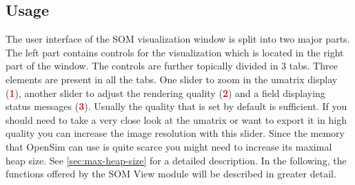 \documentclass[a4paper]{scrartcl}
\newcommand{\imagenumber}[1]{\textcolor{red}{\textbf{#1}}}
\begin{document}
\subsection{Usage}
The user interface of the SOM visualization window is split into two major parts. The left part contains controls for the visualization which is located in the right part of the window. The controls are further topically divided in 3 tabs.
Three elements are present in all the tabs. One slider to zoom in the umatrix display (\imagenumber{1}), another slider to adjust the rendering quality (\imagenumber{2}) and a field displaying status messages (\imagenumber{3}).
Usually the quality that is set by default is sufficient. If you should need to take a very close look at the umatrix or want to export it in high quality you can increase the image resolution with this slider. Since the memory that OpenSim can use is quite scarce you might need to increase its maximal heap size. See \ref{sec:max-heap-size} for a detailed description.
In the following, the functions offered by the SOM View module will be described in greater detail.
\end{document}
